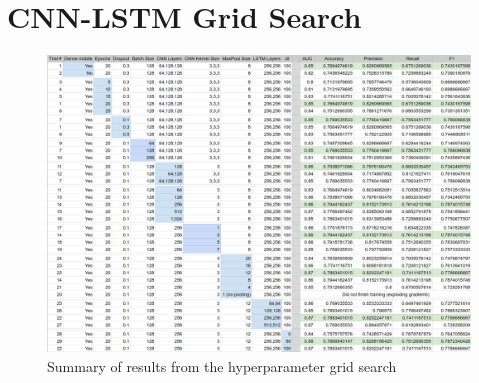 \documentclass[format=sigconf, nonacm=true, review=false, screen=true]{acmart}
\begin{document}
\section{CNN-LSTM Grid Search} \label{app:CNN-LSTM_Grid}
\renewcommand{\thefigure}{B.\arabic{figure}}
\setcounter{figure}{0}
\begin{figure}[H]
    \centering
    \includegraphics[width=\columnwidth]{figures/cnn-lstm_grid_search.png}
    \caption{Summary of results from the hyperparameter grid search}
    \label{fig:cnn-lstm_grid_table}
\end{figure}
\end{document}
